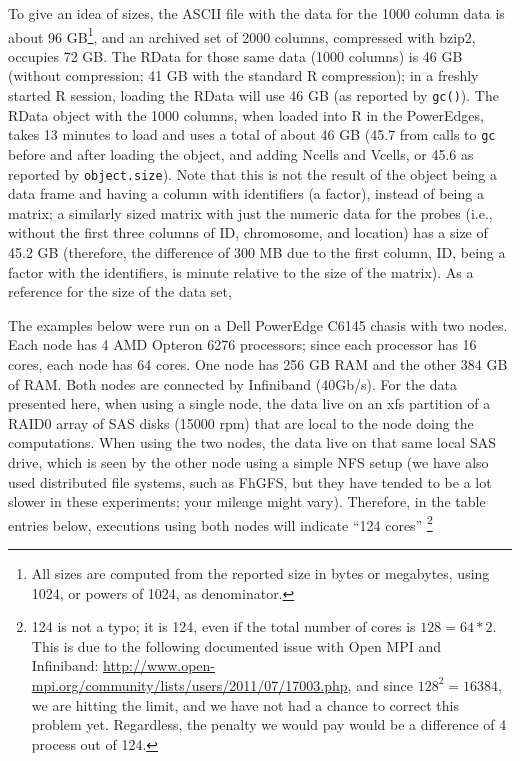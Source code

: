 \documentclass[a4paper,11pt]{article}
\begin{document}
To give an idea of sizes, the ASCII file with the data for the 1000 column
data is about 96 GB\footnote{All sizes are computed from the reported size
  in bytes or megabytes, using 1024, or powers of 1024, as denominator.},
and an archived set of 2000 columns, compressed with bzip2, occupies 72
GB. The RData for those same data (1000 columns) is 46 GB (without
compression; 41 GB with the standard R compression); in a freshly started
R session, loading the RData will use 46 GB (as reported by
\texttt{gc()}). The RData object with the 1000 columns, when loaded into R
in the PowerEdges, takes 13 minutes to load and uses a total of about 46
GB (45.7 from calls to \texttt{gc} before and after loading the object,
and adding Ncells and Vcells, or 45.6 as reported by
\texttt{object.size}). Note that this is not the result of the object
being a data frame and having a column with identifiers (a factor),
instead of being a matrix; a similarly sized matrix with just the numeric
data for the probes (i.e., without the first three columns of ID,
chromosome, and location) has a size of 45.2 GB (therefore, the difference
of 300 MB due to the first column, ID, being a factor with the
identifiers, is minute relative to the size of the matrix).  As a
reference for the size of the data set,
















The examples below were run on a Dell PowerEdge C6145 chasis with two
nodes. Each node has 4 AMD Opteron 6276 processors; since each processor
has 16 cores, each node has 64 cores. One node has 256 GB RAM and the
other 384 GB of RAM. Both nodes are connected by Infiniband (40Gb/s).  For
the data presented here, when using a single node, the data live on an xfs
partition of a RAID0 array of SAS disks (15000 rpm) that are local to the
node doing the computations. When using the two nodes, the data live on
that same local SAS drive, which is seen by the other node using a simple
NFS setup (we have also used distributed file systems, such as FhGFS, but
they have tended to be a lot slower in these experiments; your mileage
might vary). Therefore, in the table entries below, executions using both
nodes will indicate ``124 cores'' \footnote{124 is not a typo; it is 124,
  even if the total number of cores is $128 = 64 * 2$. This is due to the
  following documented issue with Open MPI and Infiniband:
  \url{http://www.open-mpi.org/community/lists/users/2011/07/17003.php},
  and since $128^2 = 16384$, we are hitting the limit, and we have not had
  a chance to correct this problem yet. Regardless, the penalty we would
  pay would be a difference of 4 process out of 124.}
\end{document}
